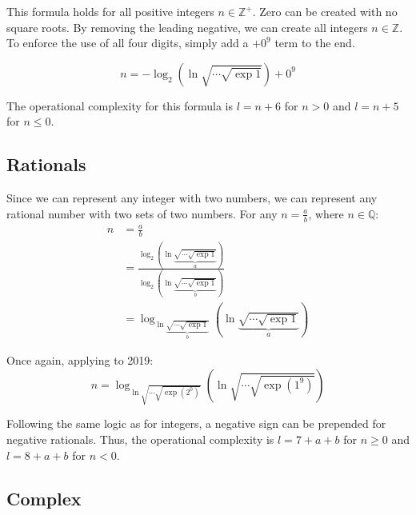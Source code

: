 This formula holds for all positive integers $n\in\mathbb{Z}^+$.
Zero can be created with no square roots.
By removing the leading negative, we can create all integers $n\in\mathbb{Z}$.
To enforce the use of all four digits, simply add a $+0^9$ term to the end.

\begin{equation}
  n = -\log_2\left(\ln \sqrt{\cdots\sqrt{\exp1}}\right)+0^9
\end{equation}

The operational complexity for this formula is $l=n+6$ for $n>0$ and $l=n+5$ for $n\leq0$.

\subsection{Rationals}
Since we can represent any integer with two numbers, we can represent any rational number with two sets of two numbers.
For any $n=\frac{a}{b}$, where $n\in\mathbb{Q}$:
\begin{align*}
  n &= \frac{a}{b} \\
  &= \frac{
      \log_2\left(
        \ln \underbrace{\sqrt{\cdots\sqrt{\exp1}}}_{a} 
      \right)
    }{
      \log_2\left(
        \ln \underbrace{\sqrt{\cdots\sqrt{\exp1}}}_{b} 
      \right)
    } \\
  &= \log_{
      \ln \underbrace{\sqrt{\cdots\sqrt{\exp1}}}_{b}
    }
    \left(
      \ln \underbrace{\sqrt{\cdots\sqrt{\exp1}}}_{a}
    \right)
\end{align*}

Once again, applying to 2019:
\begin{equation}
  n = \log_{
      \ln\sqrt{\cdots\sqrt{\exp(2^0)}}
    }
    \left(
      \ln\sqrt{\cdots\sqrt{\exp(1^9)}}
    \right)
\end{equation}

Following the same logic as for integers, a negative sign can be prepended for negative rationals.
Thus, the operational complexity is $l=7+a+b$ for $n\geq0$ and $l=8+a+b$ for $n<0$.

\subsection{Complex}
